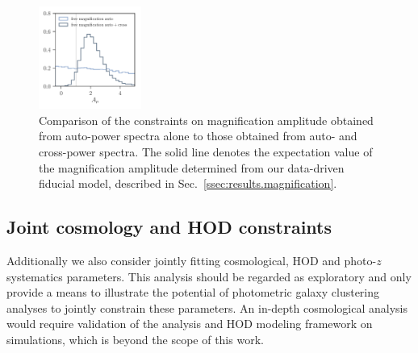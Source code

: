 \documentclass[a4paper,11pt]{article}
\begin{document}
    \begin{figure}
      \begin{center}
        \includegraphics[width=0.3\textwidth]{figures/contours-A_mu_mPk=HOD_fix=alpha-fc-sigmaM_HOD=zevol_fit=pz-shifts+prior=0p2-pz-widths+prior=0p2_fit=auto+cross_cosmo=const-LINBIAS_HOD-param=zfid_clfit=HOD-zevol_mag-bias-free-fit=auto+cross-vs-mag-bias-free-fit=auto.pdf}
        \caption{Comparison of the constraints on magnification amplitude obtained from auto-power spectra alone to those obtained from auto- and cross-power spectra. The solid line denotes the expectation value of the magnification amplitude determined from our data-driven fiducial model, described in Sec.~\ref{ssec:results.magnification}.}
        \label{fig:constraints-fit=mag-bias-ampl_fit=auto+cross-vs-fit=mag-bias-ampl_fit=auto}
      \end{center}
    \end{figure}

  \subsection{Joint cosmology and HOD constraints}\label{ssec:results.cosmo}
    Additionally we also consider jointly fitting cosmological, HOD and photo-$z$ systematics parameters. This analysis should be regarded as exploratory and only provide a means to illustrate the potential of photometric galaxy clustering analyses to jointly constrain these parameters. An in-depth cosmological analysis would require validation of the analysis and HOD modeling framework on simulations, which is beyond the scope of this work.
\end{document}

